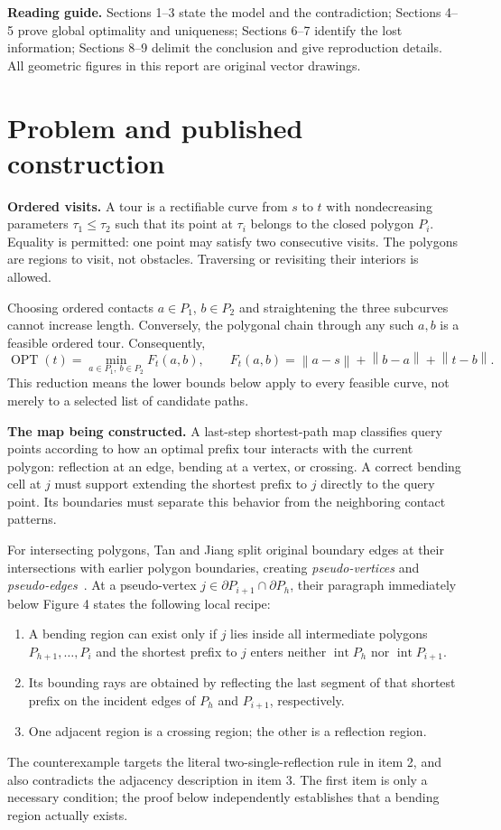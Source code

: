 \documentclass[11pt,a4paper]{article}
\newcommand{\norm}[1]{\left\lVert#1\right\rVert}
\newcommand{\inter}{\operatorname{int}}
\newcommand{\opt}{\operatorname{OPT}}
\newcommand{\sect}[2]{\section{#1}\label{#2}}
\begin{document}
\textbf{Reading guide.} Sections 1--3 state the model and the contradiction;
Sections 4--5 prove global optimality and uniqueness; Sections 6--7 identify
the lost information; Sections 8--9 delimit the conclusion and give reproduction
details. All geometric figures in this report are original vector drawings.

\clearpage
\sect{Problem and published construction}{sec:model}

\textbf{Ordered visits.} A tour is a rectifiable curve from $s$ to $t$ with
nondecreasing parameters $\tau_1\leq\tau_2$ such that its point at $\tau_i$
belongs to the closed polygon $P_i$. Equality is permitted: one point may satisfy
two consecutive visits. The polygons are regions to visit, not obstacles.
Traversing or revisiting their interiors is allowed.

Choosing ordered contacts $a\in P_1$, $b\in P_2$ and straightening the three
subcurves cannot increase length. Conversely, the polygonal chain through any
such $a,b$ is a feasible ordered tour. Consequently,
\begin{equation}
  \opt(t)=\min_{a\in P_1,\ b\in P_2}
  F_t(a,b),\qquad
  F_t(a,b)=\norm{a-s}+\norm{b-a}+\norm{t-b}.
  \label{eq:objective}
\end{equation}
This reduction means the lower bounds below apply to every feasible curve,
not merely to a selected list of candidate paths.

\textbf{The map being constructed.} A last-step shortest-path map classifies
query points according to how an optimal prefix tour interacts with the current
polygon: reflection at an edge, bending at a vertex, or crossing. A correct
bending cell at $j$ must support extending the shortest prefix to $j$ directly
to the query point. Its boundaries must separate this behavior from the
neighboring contact patterns.

For intersecting polygons, Tan and Jiang split original boundary edges at their
intersections with earlier polygon boundaries, creating \emph{pseudo-vertices}
and \emph{pseudo-edges}~\cite[Section 4, pp.~620--621]{tan}. At a pseudo-vertex
$j\in\partial P_{i+1}\cap\partial P_h$, their paragraph immediately below
Figure 4 states the following local recipe:
\begin{enumerate}
  \item A bending region can exist only if $j$ lies inside all intermediate
  polygons $P_{h+1},\ldots,P_i$ and the shortest prefix to $j$ enters neither
  $\inter P_h$ nor $\inter P_{i+1}$.
  \item Its bounding rays are obtained by reflecting the last segment of that
  shortest prefix on the incident edges of $P_h$ and $P_{i+1}$, respectively.
  \item One adjacent region is a crossing region; the other is a reflection
  region.
\end{enumerate}
The counterexample targets the literal two-single-reflection rule in item 2,
and also contradicts the adjacency description in item 3. The first item is
only a necessary condition; the proof below independently establishes that a
bending region actually exists.
\end{document}
